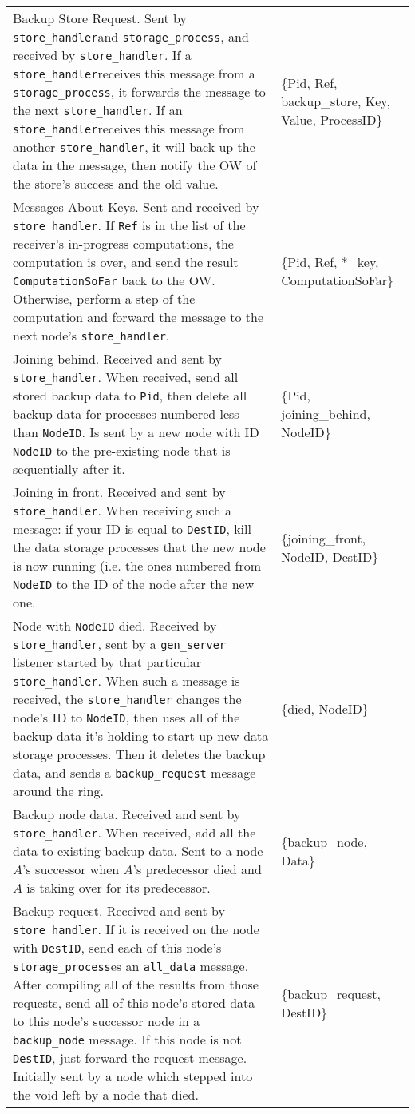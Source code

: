 \documentclass[12pt,letterpaper]{article}
\renewcommand{\tt}[1]{\texttt{#1}}
\newcommand{\sh}{\tt{store\_handler}}
\renewcommand{\sp}{\tt{storage\_process}}
\newcommand{\gs}{\tt{gen\_server}}
\begin{document}
\begin{longtable}{p{4.5in}T}
Backup Store Request. Sent by \sh and \sp, and received by \sh. If a \sh receives this message from a \sp, it forwards the message to the next \sh. If an \sh receives this message from another \sh, it will back up the data in the message, then notify the OW of the store's success and the old value. & 
\{Pid, Ref, backup\_store, Key, Value, ProcessID\} \\

Messages About Keys.  Sent and received by \sh.  If \tt{Ref} is in the list of the receiver's in-progress computations, the computation is over, and send the result \tt{ComputationSoFar} back to the OW.  Otherwise, perform a step of the computation and forward the message to the next node's \sh.  & \{Pid, Ref, *\_key, ComputationSoFar\} \\

Joining behind. Received and sent by \sh.  When received, send all stored backup data to \tt{Pid}, then delete all backup data for processes numbered less than \tt{NodeID}.  Is sent by a new node with ID \tt{NodeID} to the pre-existing node that is sequentially after it. & \{Pid, joining\_behind, NodeID\} \\

Joining in front.  Received and sent by \sh.  When receiving such a message: if your ID is equal to \tt{DestID}, kill the data storage processes that the new node is now running (i.e. the ones numbered from \tt{NodeID} to the ID of the node after the new one. & \{joining\_front, NodeID, DestID\} \\

Node with \tt{NodeID} died.  Received by \sh, sent by a \gs{} listener started by that particular \sh.  When such a message is received, the \sh{} changes the node's ID to \tt{NodeID}, then uses all of the backup data it's holding to start up new data storage processes.  Then it deletes the backup data, and sends a \tt{backup\_request} message around the ring. & \{died, NodeID\} \\

Backup node data.  Received and sent by \sh.  When received, add all the data to existing backup data.  Sent to a node $A$'s successor when $A$'s predecessor died and $A$ is taking over for its predecessor.  & \{backup\_node, Data\} \\

Backup request.  Received and sent by \sh.  If it is received on the node with \tt{DestID}, send each of this node's \sp es an \tt{all\_data} message.  After compiling all of the results from those requests, send all of this node's stored data to this node's successor node in a \tt{backup\_node} message.  If this node is not \tt{DestID}, just forward the request message.  Initially sent by a node which stepped into the void left by a node that died.  & \{backup\_request, DestID\} \\


\end{longtable}
\end{document}
